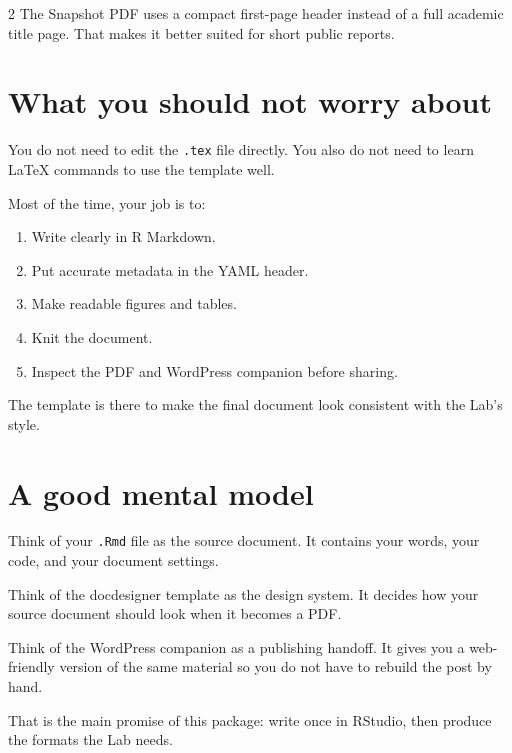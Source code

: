 \documentclass[12pt]{article}
\providecommand{\tightlist}{%
  \setlength{\itemsep}{0pt}%
  \setlength{\parskip}{0pt}%
}
\begin{document}
\begin{multicols}{2}
The Snapshot PDF uses a compact first-page header instead of a full
academic title page. That makes it better suited for short public
reports.

\section{What you should not worry
about}\label{what-you-should-not-worry-about}

You do not need to edit the \texttt{.tex} file directly. You also do not
need to learn LaTeX commands to use the template well.

Most of the time, your job is to:

\begin{enumerate}
\def\labelenumi{\arabic{enumi}.}
\tightlist
\item
  Write clearly in R Markdown.
\item
  Put accurate metadata in the YAML header.
\item
  Make readable figures and tables.
\item
  Knit the document.
\item
  Inspect the PDF and WordPress companion before sharing.
\end{enumerate}

The template is there to make the final document look consistent with
the Lab's style.

\section{A good mental model}\label{a-good-mental-model}

Think of your \texttt{.Rmd} file as the source document. It contains
your words, your code, and your document settings.

Think of the docdesigner template as the design system. It decides how your
source document should look when it becomes a PDF.

Think of the WordPress companion as a publishing handoff. It gives you a
web-friendly version of the same material so you do not have to rebuild
the post by hand.

That is the main promise of this package: write once in RStudio, then
produce the formats the Lab needs.



\end{multicols}
\end{document}
